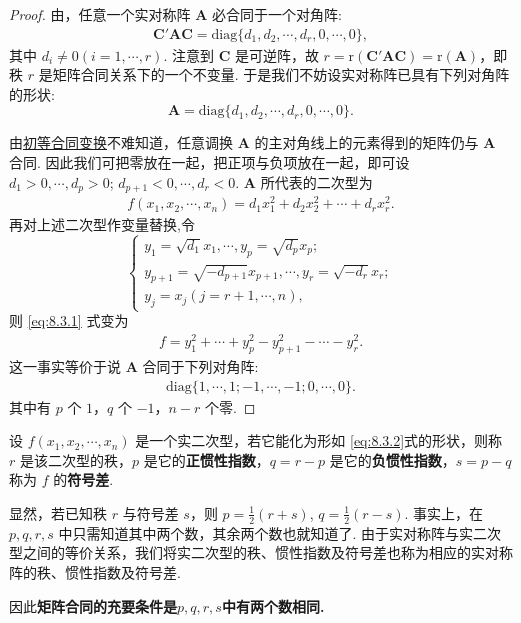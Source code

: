 \documentclass[../../main.tex]{subfiles}
\begin{document}
\begin{proof}
由，任意一个实对称阵 $\boldsymbol{A}$ 必合同于一个对角阵:
\begin{align*}
\boldsymbol{C}'\boldsymbol{A}\boldsymbol{C}=\mathrm{diag}\{d_1,d_2,\cdots,d_r,0,\cdots,0\},
\end{align*}
其中 $d_i\neq 0 (i = 1,\cdots,r)$. 注意到 $\boldsymbol{C}$ 是可逆阵，故 $r = \mathrm{r}(\boldsymbol{C}'\boldsymbol{A}\boldsymbol{C})=\mathrm{r}(\boldsymbol{A})$，即秩 $r$ 是矩阵合同关系下的一个不变量. 于是我们不妨设实对称阵已具有下列对角阵的形状:
\[
\boldsymbol{A}=\mathrm{diag}\{d_1,d_2,\cdots,d_r,0,\cdots,0\}.
\]

由\hyperref[lemma:初等合同变换]{初等合同变换}不难知道，任意调换 $\boldsymbol{A}$ 的主对角线上的元素得到的矩阵仍与 $\boldsymbol{A}$ 合同. 因此我们可把零放在一起，把正项与负项放在一起，即可设 $d_1>0,\cdots,d_p>0$; $d_{p + 1}<0,\cdots,d_r<0$. $\boldsymbol{A}$ 所代表的二次型为
\begin{align}
f(x_1,x_2,\cdots,x_n)=d_1x_1^2 + d_2x_2^2 + \cdots + d_rx_r^2.\label{eq:8.3.1}
\end{align}
再对上述二次型作变量替换,令
\[
\begin{cases}
y_1 = \sqrt{d_1}x_1,\cdots,y_p = \sqrt{d_p}x_p;\\
y_{p + 1} = \sqrt{-d_{p + 1}}x_{p + 1},\cdots,y_r = \sqrt{-d_r}x_r;\\
y_j = x_j (j = r + 1,\cdots,n),
\end{cases}
\]
则 \eqref{eq:8.3.1} 式变为
\begin{align*}
f = y_1^2 + \cdots + y_p^2 - y_{p + 1}^2 - \cdots - y_r^2.
\end{align*}
这一事实等价于说 $\boldsymbol{A}$ 合同于下列对角阵:
\begin{align*}
\mathrm{diag}\{1,\cdots,1;-1,\cdots,-1;0,\cdots,0\}.
\end{align*}
其中有 $p$ 个 $1$，$q$ 个 $-1$，$n - r$ 个零. 

\end{proof}

\begin{definition}
设 $f(x_1,x_2,\cdots,x_n)$ 是一个实二次型，若它能化为形如 \eqref{eq:8.3.2}式的形状，则称 $r$ 是该二次型的秩，$p$ 是它的\textbf{正惯性指数}，$q = r - p$ 是它的\textbf{负惯性指数}，$s = p - q$ 称为 $f$ 的\textbf{符号差}.
\end{definition}
\begin{remark}
显然，若已知秩 $r$ 与符号差 $s$，则 $p = \frac{1}{2}(r + s)$, $q = \frac{1}{2}(r - s)$. 事实上，在 $p,q,r,s$ 中只需知道其中两个数，其余两个数也就知道了. 由于实对称阵与实二次型之间的等价关系，我们将实二次型的秩、惯性指数及符号差也称为相应的实对称阵的秩、惯性指数及符号差.

因此\textbf{矩阵合同的充要条件是$p,q,r,s$中有两个数相同.}
\end{remark}
\end{document}
